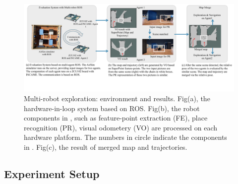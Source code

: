 \label{sec:experiments}


\begin{figure}[t]
 \centering
 \includegraphics[width=0.99\linewidth]{fig/env.pdf}
 \caption{Multi-robot exploration: environment and results. Fig(a), the hardware-in-loop system based on ROS. Fig(b), the robot components in , such as feature-point extraction (FE), place recognition (PR), visual odometery (VO) are processed on each hardware platform. The numbers in circle indicate the components in . Fig(c), the result of merged map and trajectories.}
 \label{fig:env}
\end{figure}





\subsection{ Experiment Setup }

